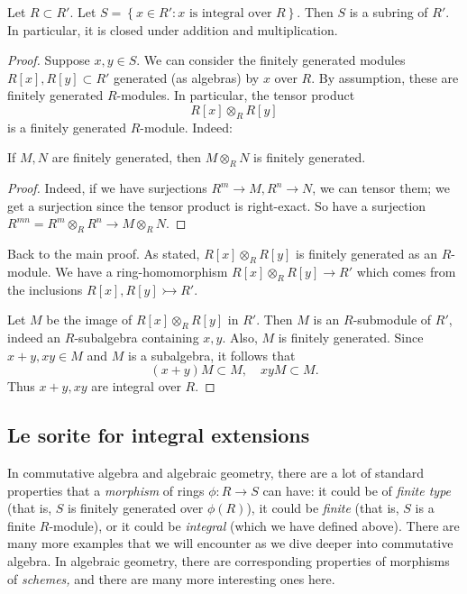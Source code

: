 \begin{theorem} 
Let $R \subset R'$. Let $S = \left\{x \in R': x \text{ is integral over }
R\right\}$. Then $S$ is a subring of $R'$. In particular, it is closed under
addition and multiplication. 
\end{theorem} 
\begin{proof} 
Suppose $x,y \in S$.  
We can consider the finitely generated modules $R[x], R[y] \subset R'$
generated (as algebras) by $x$ over $R$. By assumption, these are finitely
generated $R$-modules. In particular, the tensor product
\[ R[x] \otimes_R R[y]  \]
is a finitely generated $R$-module. 
Indeed:
\begin{lemma} 
If $M, N$ are finitely generated, then $M \otimes_R N$ is finitely generated.  
\end{lemma} 
\begin{proof} 
Indeed, if we have surjections $R^m \to M, R^n \to N$, we can tensor them; we
get a surjection since the tensor product is right-exact.
So have a surjection
$R^{m n} = R^m \otimes_R R^n \to M \otimes_R N$. 
\end{proof} 

Back to the main proof. As stated, $R[x] \otimes_R R[y]$ is finitely generated
as an $R$-module. We have a ring-homomorphism $R[x]\otimes_R R[y] \to R'$
which comes from the inclusions $R[x], R[y] \rightarrowtail R'$.

Let $M$ be the image of $R[x] \otimes_R R[y]$ in $R'$. Then $M$ is an
$R$-submodule of $R'$, indeed an $R$-subalgebra containing $x,y$.  Also, $M$ is
finitely generated. Since $x+y, xy\in M$ and $M$ is a subalgebra, it follows that
\[ (x+y) M \subset M, \quad xy M \subset M.  \]
Thus $x+y, xy$ are integral over $R$.
\end{proof} 

\subsection{Le sorite for integral extensions}

In commutative algebra and algebraic geometry, there are a lot of standard
properties that a \emph{morphism} of rings $\phi: R \to S$ can have: it could
be of \emph{finite type} (that is, $S$ is finitely generated over $\phi(R)$),
it could be \emph{finite} (that is, $S$ is a finite $R$-module), or it could
be \emph{integral} (which we have defined above). There are many more examples
that we will encounter as we dive deeper into commutative algebra.
In algebraic geometry, there are corresponding properties of morphisms of
\emph{schemes,} and there are many more interesting ones here.

